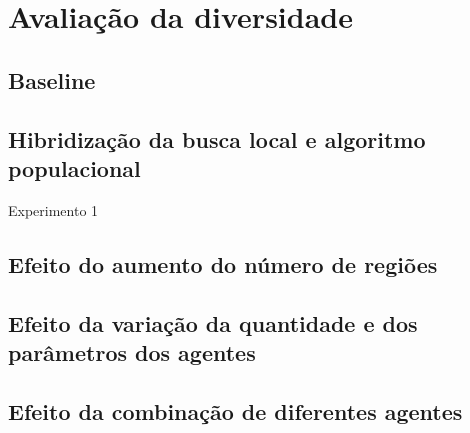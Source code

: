 
\section{Avaliação da diversidade}
\subsection{Baseline}
\begin{frame}\justifying
    \begin{itemize}
    \end{itemize}
\end{frame}

\subsection{Hibridização da busca local e algoritmo populacional}
\begin{frame}{Experimento 1}
    \begin{itemize}
    \end{itemize}
\end{frame}

\subsection{Efeito do aumento do número de regiões}
\begin{frame}\justifying
    \scriptsize{\begin{figure}
        \centering
    \end{figure}}
\end{frame}

\subsection{Efeito da variação da quantidade e dos parâmetros dos agentes}
\begin{frame}\justifying
    \scriptsize{\begin{figure}
        \centering
    \end{figure}}
\end{frame}

\subsection{Efeito da combinação de diferentes agentes}
\begin{frame}\justifying
    \scriptsize{\begin{figure}
        \centering
    \end{figure}}
\end{frame}
